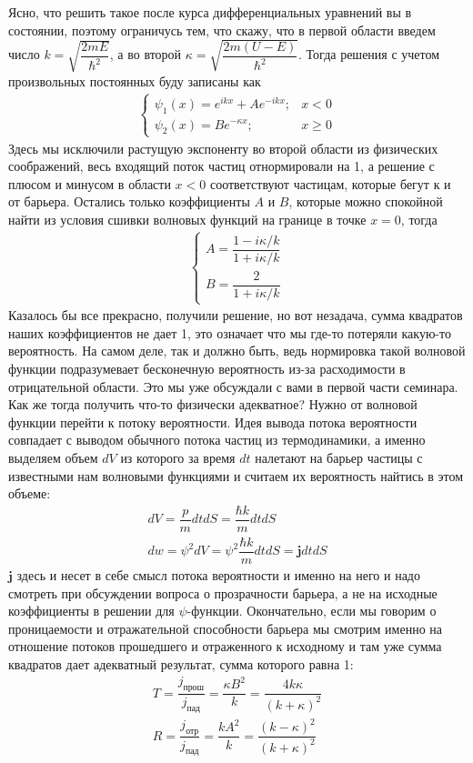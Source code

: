 \documentclass[12pt]{article}
\begin{document}
Ясно, что решить такое после курса дифференциальных уравнений вы в состоянии, поэтому ограничусь тем, что скажу, что в первой области введем число $k = \sqrt{\dfrac{2mE}{\hbar^2}}$, а во второй $ \kappa = \sqrt{\dfrac{2m(U -E)}{\hbar^2}}$. Тогда решения с учетом произвольных постоянных буду записаны как
\begin{gather*}
    \begin{cases}
         \psi_1(x) = e^{ikx} + A e^{-ikx}; &x<0  \\
         \psi_2(x) = Be^{-\kappa x}; &x\ge 0  
    \end{cases}
\end{gather*}
Здесь мы исключили растущую экспоненту во второй области из физических соображений, весь входящий поток частиц отнормировали на 1, а решение с плюсом и минусом в области $x<0$ соответствуют частицам, которые бегут к и от барьера. Остались только коэффициенты $A$ и $B$, которые можно спокойной найти из условия сшивки волновых функций на границе в точке $x=0$, тогда 
\begin{gather*}
    \begin{cases}
        A = \dfrac{1 - i\kappa/k}{1 + i\kappa/k}\\[5pt]
        B = \dfrac{2}{1 + i\kappa/k}
    \end{cases}
\end{gather*}
Казалось бы все прекрасно, получили решение, но вот незадача, сумма квадратов наших коэффициентов не дает 1, это означает что мы где-то потеряли какую-то вероятность. На самом деле, так и должно быть, ведь нормировка такой волновой функции подразумевает бесконечную вероятность из-за расходимости в отрицательной области. Это мы уже обсуждали с вами в первой части семинара. Как же тогда получить что-то физически адекватное? Нужно от волновой функции перейти к потоку вероятности. Идея вывода потока вероятности совпадает с выводом обычного потока частиц из термодинамики, а именно выделяем объем $dV$ из которого за время $dt$ налетают на барьер частицы с известными нам волновыми функциями и считаем их вероятность найтись в этом объеме:
\begin{gather*}
    dV = \dfrac{p}{m}dtdS = \dfrac{\hbar k}{m}dtdS\\
    dw = \psi^2dV = \psi^2\dfrac{\hbar k}{m}dtdS = \textbf{j}dtdS
\end{gather*}
$\textbf{j}$ здесь и несет в себе смысл потока вероятности  и именно на него и надо смотреть при обсуждении вопроса о прозрачности барьера, а не на исходные коэффициенты в решении для $\psi$-функции. Окончательно, если мы говорим о проницаемости и отражательной способности барьера мы смотрим именно на отношение потоков прошедшего и отраженного к исходному и там уже сумма квадратов дает адекватный результат, сумма которого равна 1:
\begin{gather*}
    T = \dfrac{j_{\text{прош}}}{j_{\text{пад}}} = \dfrac{\kappa B^2}{k} = \dfrac{4k\kappa}{(k+\kappa)^2} \\
    R = \dfrac{j_{\text{отр}}}{j_{\text{пад}}} = \dfrac{k A^2}{k} = \dfrac{(k-\kappa)^2}{(k+\kappa)^2}
\end{gather*}
\end{document}
